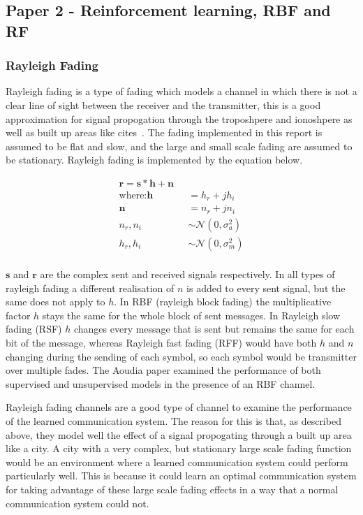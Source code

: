 \documentclass[12pt,onecolumn,letterpaper]{article}
\begin{document}
\subsection{Paper 2 - Reinforcement learning, RBF and RF}

\subsubsection{Rayleigh Fading}

Rayleigh fading is a type of fading which models a channel in which there is not a clear line of sight between the receiver and the transmitter, this is a good approximation for signal propogation through the troposhpere and ionoshpere as well as built up areas like cites~\cite{RayleighProakis}. The fading implemented in this report is assumed to be flat and slow, and the large and small scale fading are assumed to be stationary. Rayleigh fading is implemented by the equation below.

\begin{align}
   \mathbf{r} = \mathbf{s}*\mathbf{h} + \mathbf{n} \mbox{ }&\nonumber\\
   \mbox{where:}\mathbf{h} &= h_r + jh_i \nonumber\\
   \mathbf{n} &= n_r + jn_i \nonumber\\
   n_r,n_i &\sim \mathcal{N}(0,\sigma_a^2) \nonumber\\
   h_r,h_i &\sim \mathcal{N}(0,\sigma_m^2) \nonumber\\
   \label{eq:RaylieghDef}
\end{align}

$\mathbf{s}$ and $\mathbf{r}$ are the complex sent and received signals respectively. In all types of rayleigh fading a different realisation of $n$ is added to every sent signal, but the same does not apply to $h$. In RBF (rayleigh block fading) the multiplicative factor $h$ stays the same for the whole block of sent messages. In Rayleigh slow fading (RSF) $h$ changes every message that is sent but remains the same for each bit of the message, whereas Rayleigh fast fading (RFF) would have both $h$ and $n$ changing during the sending of each symbol, so each symbol would be transmitter over multiple fades. The Aoudia paper examined the performance of both supervised and unsupervised models in the presence of an RBF channel.

Rayleigh fading channels are a good type of channel to examine the performance of the learned communication system. The reason for this is that, as described above, they model well the effect of a signal propogating through a built up area like a city. A city with a very complex, but stationary large scale fading function would be an environment where a learned communication system could perform particularly well. This is because it could learn an optimal communication system for taking advantage of these large scale fading effects in a way that a normal communication system could not.
\end{document}
